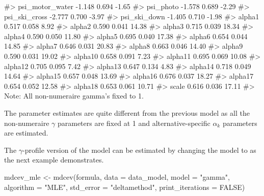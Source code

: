 \begin{Schunk}
\begin{Soutput}
#> psi_motor_water      -1.148   0.694  -1.65
#> psi_photo            -1.578   0.689  -2.29
#> psi_ski_cross        -2.777   0.700  -3.97
#> psi_ski_down         -1.405   0.710  -1.98
#> alpha1                0.517   0.058   8.92
#> alpha2                0.590   0.041  14.38
#> alpha3                0.715   0.039  18.34
#> alpha4                0.590   0.050  11.80
#> alpha5                0.695   0.040  17.38
#> alpha6                0.654   0.044  14.85
#> alpha7                0.646   0.031  20.83
#> alpha8                0.663   0.046  14.40
#> alpha9                0.590   0.031  19.02
#> alpha10               0.658   0.091   7.23
#> alpha11               0.695   0.069  10.08
#> alpha12               0.705   0.095   7.42
#> alpha13               0.647   0.134   4.83
#> alpha14               0.718   0.049  14.64
#> alpha15               0.657   0.048  13.69
#> alpha16               0.676   0.037  18.27
#> alpha17               0.654   0.052  12.58
#> alpha18               0.653   0.061  10.71
#> scale                 0.616   0.036  17.11
#> Note: All non-numeraire gamma's fixed to 1.
\end{Soutput}
\end{Schunk}

The parameter estimates are quite different from the previous model as
all the non-numeraire \(\gamma\) parameters are fixed at 1 and
alternative-specific \(\alpha_k\) parameters are estimated.

The \(\gamma\)-profile version of the model can be estimated by changing
the model to  as the next example demonstrates.

\begin{Schunk}
\begin{Sinput}
mdcev_mle <- mdcev(formula,
                    data = data_model,
                    model = "gamma",
                    algorithm = "MLE",
                    std_error = "deltamethod",
                    print_iterations = FALSE)
\end{Sinput}
\end{Schunk}

